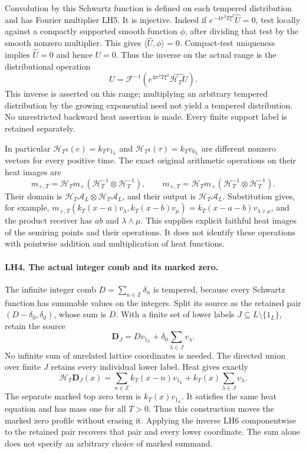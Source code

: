 Convolution by this Schwartz function is defined on each tempered
distribution and has Fourier multiplier LH5. It is injective.
Indeed if \(e^{-4\pi^2T\xi^2}\widehat U=0\), test locally
against a compactly supported smooth function \(\phi\), after
dividing that test by the smooth nonzero multiplier. This gives
\(\langle\widehat U,\phi\rangle=0\). Compact-test uniqueness
implies \(\widehat U=0\) and hence \(U=0\). Thus the inverse
on the actual range is the distributional operation
\[
 U=\mathcal F^{-1}
       \left(e^{4\pi^2T\xi^2}\widehat{\mathcal H_TU}\right).
                                                               \tag{LH6}
\]
This inverse is asserted on this range; multiplying an arbitrary
tempered distribution by the growing exponential need not yield
a tempered distribution. No unrestricted backward heat assertion
is made. Every finite support label is retained separately.

In particular \(\mathcal H_T\iota(e)=k_Tv_{1_L}\) and
\(\mathcal H_T\iota(\tau)=k_Tv_{0_L}\) are different nonzero
vectors for every positive time. The exact original arithmetic
operations on their heat images are
\[
 m_{+,T}=\mathcal H_Tm_+
        (\mathcal H_T^{-1}\otimes\mathcal H_T^{-1}),\qquad
 m_{\times,T}=\mathcal H_Tm_\times
        (\mathcal H_T^{-1}\otimes\mathcal H_T^{-1}).             \tag{LH7}
\]
Their domain is \(\mathcal H_T\mathcal A_L\otimes
\mathcal H_T\mathcal A_L\), and their output is
\(\mathcal H_T\mathcal A_L\). Substitution gives, for example,
\(m_{+,T}(k_T(x-a)v_\lambda,k_T(x-b)v_\mu)
=k_T(x-a-b)v_{\lambda\vee\mu}\), and the product receiver
has \(ab\) and \(\lambda\wedge\mu\). This supplies explicit
faithful heat images of the semiring points and their operations.
It does not identify these operations with pointwise addition
and multiplication of heat functions.

\paragraph{LH4. The actual integer comb and its marked zero.}
The infinite integer comb \(D=\sum_{n\in\mathbb Z}\delta_n\)
is tempered, because every Schwartz function has summable values
on the integers. Split its source as the retained pair
\((D-\delta_0,\delta_0)\), whose sum is \(D\). With a finite
set of lower labels \(J\subseteq L\setminus\{1_L\}\), retain
the source
\[
 \mathbf D_J=Dv_{1_L}+\delta_0\sum_{\lambda\in J}v_\lambda.
                                                               \tag{LH8}
\]
No infinite sum of unrelated lattice coordinates is needed. The
directed union over finite \(J\) retains every individual lower
label. Heat gives exactly
\[
 \mathcal H_T\mathbf D_J(x)
  =\sum_{n\in\mathbb Z}k_T(x-n)v_{1_L}
        +k_T(x)\sum_{\lambda\in J}v_\lambda.       \tag{LH9}
\]
The separate marked top zero term is \(k_T(x)v_{1_L}\).
It satisfies the same heat equation and has mass one for all
\(T>0\). Thus this construction moves the marked zero profile
without erasing it. Applying the inverse LH6 componentwise to the
retained pair recovers that pair and every lower coordinate. The
sum alone does not specify an arbitrary choice of marked summand.

